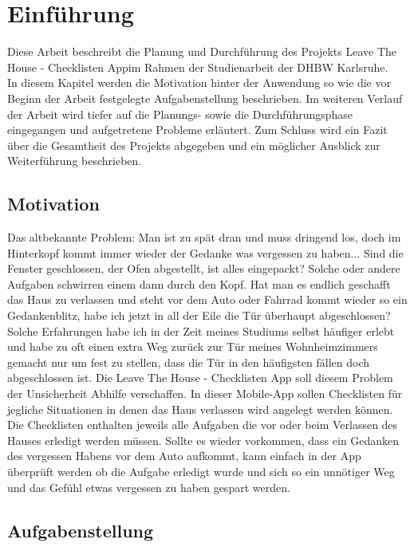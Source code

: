 \chapter{Einführung}\label{chpt:einführung}

Diese Arbeit beschreibt die Planung und Durchführung des Projekts \glqq Leave The House - Checklisten App\grqq im Rahmen der Studienarbeit der \ac{DHBW} Karlsruhe.\\
In diesem Kapitel werden die Motivation hinter der Anwendung so wie die vor Beginn der Arbeit festgelegte Aufgabenstellung beschrieben. Im weiteren Verlauf der Arbeit wird tiefer auf die Planungs- sowie die Durchführungsphase eingegangen und aufgetretene Probleme erläutert. Zum Schluss wird ein Fazit über die Gesamtheit des Projekts abgegeben und ein möglicher Ausblick zur Weiterführung beschrieben.

\section{Motivation}\label{sec:motivation}

Das altbekannte Problem: Man ist zu spät dran und muss dringend los, doch im Hinterkopf kommt immer wieder der Gedanke was vergessen zu haben... Sind die Fenster geschlossen, der Ofen abgestellt, ist alles eingepackt? Solche oder andere Aufgaben schwirren einem dann durch den Kopf. Hat man es endlich geschafft das Haus zu verlassen und steht vor dem Auto oder Fahrrad kommt wieder so ein Gedankenblitz, habe ich jetzt in all der Eile die Tür überhaupt abgeschlossen?\\
Solche Erfahrungen habe ich in der Zeit meines Studiums selbst häufiger erlebt und habe zu oft einen extra Weg zurück zur Tür meines Wohnheimzimmers gemacht nur um fest zu stellen, dass die Tür in den häufigsten fällen doch abgeschlossen ist. Die \glqq Leave The House - Checklisten App\grqq{} soll diesem Problem der Unsicherheit Abhilfe verschaffen. In dieser Mobile-App sollen Checklisten für jegliche Situationen in denen das Haus verlassen wird angelegt werden können. Die Checklisten enthalten jeweils alle Aufgaben die vor oder beim Verlassen des Hauses erledigt werden müssen. Sollte es wieder vorkommen, dass ein Gedanken des vergessen Habens vor dem Auto aufkommt, kann einfach in der App überprüft werden ob die Aufgabe erledigt wurde und sich so ein unnötiger Weg und das Gefühl etwas vergessen zu haben gespart werden.

\section{Aufgabenstellung}\label{sec:Aufgabenstellung}


